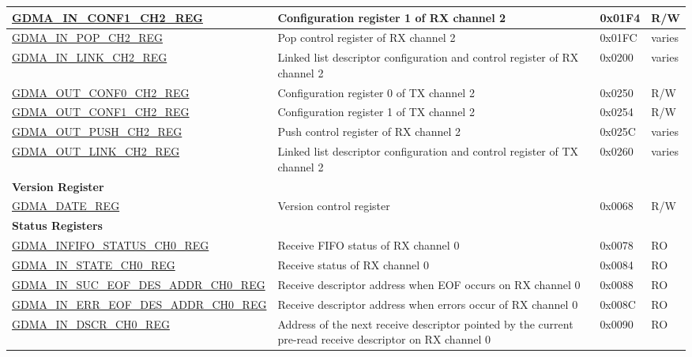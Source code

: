 \begin{longtable}{ | p{6.7cm} | p{6cm} | p{1.3cm} | p{1.5cm} | }
\hyperref[regdesc:GDMAINCONF1CHNREG]{GDMA\_IN\_CONF1\_CH2\_REG} & Configuration register 1 of RX channel 2 & 0x01F4 & R/W \\ \hline
\hyperref[regdesc:GDMAINPOPCHNREG]{GDMA\_IN\_POP\_CH2\_REG} & Pop control register of RX channel 2 & 0x01FC & varies \\ \hline
\hyperref[regdesc:GDMAINLINKCHNREG]{GDMA\_IN\_LINK\_CH2\_REG} & Linked list descriptor configuration and control register of RX channel 2 & 0x0200 & varies \\ \hline
\hyperref[regdesc:GDMAOUTCONF0CHNREG]{GDMA\_OUT\_CONF0\_CH2\_REG} & Configuration register 0 of TX channel 2 & 0x0250 & R/W \\ \hline
\hyperref[regdesc:GDMAOUTCONF1CHNREG]{GDMA\_OUT\_CONF1\_CH2\_REG} & Configuration register 1 of TX channel 2 & 0x0254 & R/W \\ \hline
\hyperref[regdesc:GDMAOUTPUSHCHNREG]{GDMA\_OUT\_PUSH\_CH2\_REG} & Push control register of RX channel 2 & 0x025C & varies \\ \hline
\hyperref[regdesc:GDMAOUTLINKCHNREG]{GDMA\_OUT\_LINK\_CH2\_REG} & Linked list descriptor configuration and control register of TX channel 2 & 0x0260 & varies \\ \hline
\multicolumn{4}{|l|}{\textbf{Version Register}} \\ \hline
\hyperref[regdesc:GDMADATEREG]{GDMA\_DATE\_REG} & Version control register & 0x0068 & R/W \\ \hline
\multicolumn{4}{|l|}{\textbf{Status Registers}} \\ \hline
\hyperref[regdesc:GDMAINFIFOSTATUSCHNREG]{GDMA\_INFIFO\_STATUS\_CH0\_REG} & Receive FIFO status of RX channel 0 & 0x0078 & RO \\ \hline
\hyperref[regdesc:GDMAINSTATECHNREG]{GDMA\_IN\_STATE\_CH0\_REG} & Receive status of RX channel 0 & 0x0084 & RO \\ \hline
\hyperref[regdesc:GDMAINSUCEOFDESADDRCHNREG]{GDMA\_IN\_SUC\_EOF\_DES\_ADDR\_CH0\_REG} & Receive descriptor address when EOF occurs on RX channel 0 & 0x0088 & RO \\ \hline
\hyperref[regdesc:GDMAINERREOFDESADDRCHNREG]{GDMA\_IN\_ERR\_EOF\_DES\_ADDR\_CH0\_REG} & Receive descriptor address when errors occur of RX channel 0 & 0x008C & RO \\ \hline
\hyperref[regdesc:GDMAINDSCRCHNREG]{GDMA\_IN\_DSCR\_CH0\_REG} & Address of the next receive descriptor pointed by the current pre-read receive descriptor on RX channel 0 & 0x0090 & RO \\ \hline

\end{longtable}
